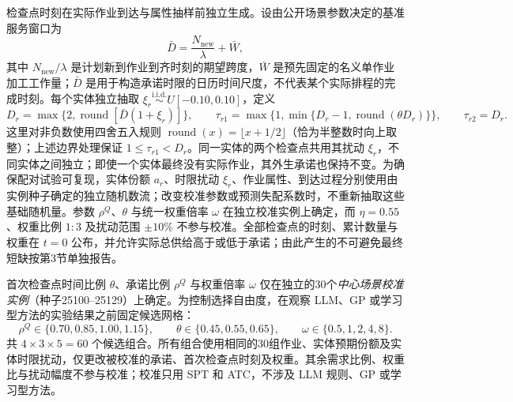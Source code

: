 检查点时刻在实际作业到达与属性抽样前独立生成。设由公开场景参数决定的基准服务窗口为
\begin{equation}\label{eq:checkpoint_window_gen}
  \bar D=\frac{N_{\mathrm{new}}}{\lambda}+\bar W,
\end{equation}
其中 $N_{\mathrm{new}}/\lambda$ 是计划新到作业到齐时刻的期望跨度，$\bar W$ 是预先固定的名义单作业加工工作量；$\bar D$ 是用于构造承诺时限的日历时间尺度，不代表某个实际排程的完成时刻。每个实体独立抽取 $\xi_r\overset{\mathrm{i.i.d.}}{\sim}U[-0.10,0.10]$，定义
\begin{equation}\label{eq:checkpoint_deadline_gen}
  D_r=\max\{2,\operatorname{round}[\bar D(1+\xi_r)]\},\qquad
  \tau_{r1}=\max\{1,\min\{D_r-1,\operatorname{round}(\theta D_r)\}\},\qquad
  \tau_{r2}=D_r.
\end{equation}
这里对非负数使用四舍五入规则 $\operatorname{round}(x)=\lfloor x+1/2\rfloor$（恰为半整数时向上取整）；上述边界处理保证 $1\le\tau_{r1}<D_r$。同一实体的两个检查点共用其扰动 $\xi_r$，不同实体之间独立；即使一个实体最终没有实际作业，其外生承诺也保持不变。为确保配对试验可复现，实体份额 $a_r$、时限扰动 $\xi_r$、作业属性、到达过程分别使用由实例种子确定的独立随机数流；改变校准参数或预测失配系数时，不重新抽取这些基础随机量。参数 $\rho^Q$、$\theta$ 与统一权重倍率 $\omega$ 在独立校准实例上确定，而 $\eta=0.55$、权重比例 $1:3$ 及扰动范围 $\pm10\%$ 不参与校准。全部检查点的时刻、累计数量与权重在 $t=0$ 公布，并允许实际总供给高于或低于承诺；由此产生的不可避免最终短缺按第3节单独报告。

首次检查点时间比例 $\theta$、承诺比例 $\rho^Q$ 与权重倍率 $\omega$ 仅在独立的30个\emph{中心场景校准实例}（种子25100--25129）上确定。为控制选择自由度，在观察 LLM、GP 或学习型方法的实验结果之前固定候选网格：
\begin{equation}\label{eq:service_calibration_grid}
  \rho^Q\in\{0.70,0.85,1.00,1.15\},\qquad
  \theta\in\{0.45,0.55,0.65\},\qquad
  \omega\in\{0.5,1,2,4,8\}.
\end{equation}
共 $4\times3\times5=60$ 个候选组合。所有组合使用相同的30组作业、实体预期份额及实体时限扰动，仅更改被校准的承诺、首次检查点时刻及权重。其余需求比例、权重比与扰动幅度不参与校准；校准只用 SPT 和 ATC，不涉及 LLM 规则、GP 或学习型方法。

